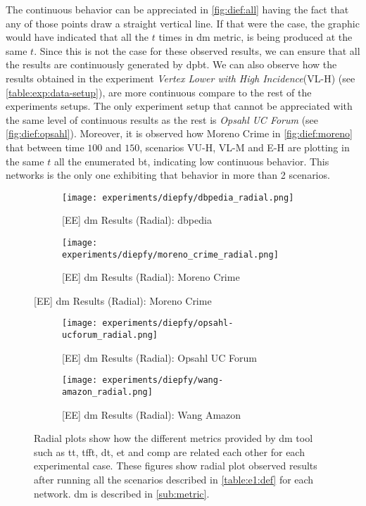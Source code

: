 The continuous behavior can be appreciated in \autoref{fig:dief:all} having the fact that any of those points draw a straight vertical line. If that were the case, the graphic would have indicated that all the $t$ times in \acrshort{dm} metric, is being produced at the same $t$.
Since this is not the case for these observed results, we can ensure that all the results are continuously generated by \acrshort{dpbt}.
We can also observe how the results obtained in the experiment \emph{Vertex Lower with High Incidence}(VL-H) (see \autoref{table:exp:data-setup}), are more continuous compare to the rest of the experiments setups. 
The only experiment setup that cannot be appreciated with the same level of continuous results as the rest is \emph{Opsahl UC Forum} (see \autoref{fig:dief:opsahl}). 
Moreover, it is observed how Moreno Crime in \autoref{fig:dief:moreno} that between time $100$ and $150$, scenarios VU-H, VL-M and E-H are plotting in the same $t$ all the enumerated \acrshort{bt}, indicating low continuous behavior. This networks is the only one exhibiting that behavior in more than 2 scenarios.

\begin{figure}[!htb]
  \centering
  \begin{subfigure}{0.5\textwidth}
  \texttt{[image: experiments/diepfy/dbpedia\_radial.png]}
    \caption{{[EE] \acrshort{dm} Results (Radial): \acrshort{dbpedia}}}
    \label{fig:dief:dbpedia-radial}
  \end{subfigure}%
  \begin{subfigure}{0.5\textwidth}
  \texttt{[image: experiments/diepfy/moreno\_crime\_radial.png]}
    \caption{{[EE] \acrshort{dm} Results (Radial): Moreno Crime}}
    \label{fig:dief:moreno-radial}
  \end{subfigure}
\end{figure}
%
\begin{figure}[!htb]
  \centering
  \begin{subfigure}{0.5\textwidth}
  \texttt{[image: experiments/diepfy/opsahl-ucforum\_radial.png]}
    \caption{{[EE] \acrshort{dm} Results (Radial): Opsahl UC Forum}}
    \label{fig:dief:opsahl-radial}
  \end{subfigure}%
  \begin{subfigure}{0.5\textwidth}
    \texttt{[image: experiments/diepfy/wang-amazon\_radial.png]}
    \caption{{[EE] \acrshort{dm} Results (Radial): Wang Amazon}}
    \label{fig:dief:wang-radial}
  \end{subfigure}
  \caption[{[EE] \acrshort{dm} General Results (Radial)}]{Radial plots show how the different metrics provided by \acrshort{dm} tool such as \acrfull{tt}, \acrfull{tfft}, \acrfull{dt}, \acrfull{et} and \acrfull{comp} are related each other for each experimental case. These figures show radial plot observed results after running all the scenarios described in \autoref{table:e1:def} for each network. \acrshort{dm} is described in \autoref{sub:metric}.}
\end{figure}

